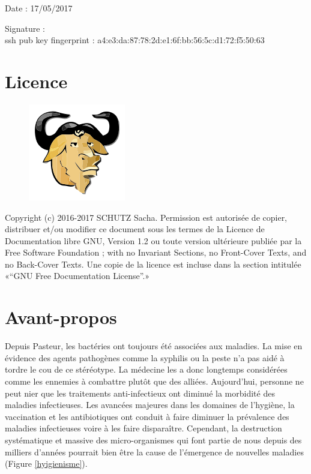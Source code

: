 \documentclass[12pt,a4paper]{article}
\begin{document}
Date : 17/05/2017

\vspace{0.5cm}

Signature : \\

ssh pub key fingerprint : a4:e3:da:87:78:2d:e1:6f:bb:56:5c:d1:72:f5:50:63
\vfill

\section*{Licence}

\begin{figure}
\includegraphics[scale=0.5]{img/gfdl.png}\hfill
\end{figure}

Copyright (c) 2016-2017 SCHUTZ Sacha. Permission est autorisée de copier,
distribuer et/ou modifier ce document sous les termes de la Licence de
Documentation libre GNU, Version 1.2 ou toute version ultérieure publiée
par la Free Software Foundation ; with no Invariant Sections, no
Front-Cover Texts, and no Back-Cover Texts. Une copie de la licence est
incluse dans la section intitulée «``GNU Free Documentation License''.»

\thispagestyle{empty}
\setcounter{page}{0}
\thispagestyle{empty}

\newpage

\tableofcontents
\newpage


\section{Avant-propos}

Depuis Pasteur, les bactéries ont toujours été associées aux maladies. La mise en évidence des agents pathogènes comme la syphilis ou la peste n'a pas aidé à tordre le cou de ce stéréotype. La médecine les a donc longtemps considérées comme les ennemies à combattre plutôt que des alliées.
Aujourd'hui, personne ne peut nier que les traitements anti-infectieux ont diminué la morbidité des maladies infectieuses.
Les avancées majeures dans les domaines de l'hygiène, la vaccination et les antibiotiques ont conduit à faire diminuer la prévalence des maladies infectieuses voire à les faire disparaître. Cependant, la destruction systématique et massive des micro-organismes qui font partie de nous depuis des milliers d'années pourrait bien être la cause de l'émergence de nouvelles maladies\cite{Bach2002} (Figure \ref{hyigienisme}).
\end{document}
